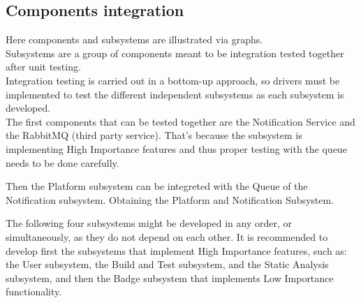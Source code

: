 \subsection{Components integration}
Here components and subsystems are illustrated via graphs. \\
Subsystems are a group of components meant to be integration tested together after unit testing.\\
Integration testing is carried out in a bottom-up approach, so drivers must be implemented to test the different independent subsystems as each subsystem is developed.\\
The first components that can be tested together are the Notification Service and the RabbitMQ (third party service).
That's because the subsystem is implementing High Importance features and thus proper testing with the queue needs to be done carefully.
\begin{adjustbox}{
        max size={\textwidth}{},
        caption={Notitification subsystem},
        label={fig:Notitification subsystem},
        figure=H}
    \centering
\end{adjustbox}

Then the Platform subsystem can be integreted with the Queue of the Notification subsystem.
Obtaining the Platform and Notification Subsystem.
\begin{adjustbox}{
        max size={\textwidth}{},
        caption={Platform and Notification subsystem},
        label={fig:Platform and Notification subsystem},
        figure=H}
    \centering
\end{adjustbox}

The following four subsystems might be developed in any order, or simultaneously, as they do not depend
on each other.
It is recommended to develop first the subsystems that implement High Importance features, such as:\\
the User subsystem, the Build and Test subsystem, and the Static Analysis subsystem, and then the Badge subsystem that implements Low Importance functionality.
\begin{adjustbox}{
        max size={\textwidth}{},
        caption={User subsystem},
        label={fig:User subsystem},
        figure=H}
    \centering
\end{adjustbox}

